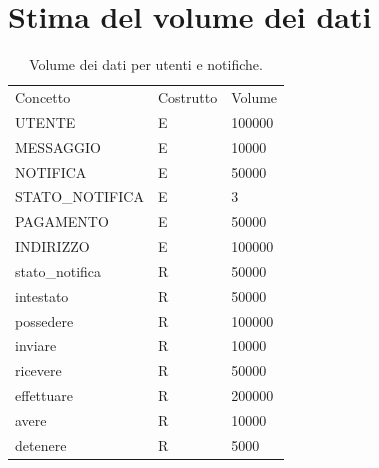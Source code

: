 \documentclass[a4paper,12pt]{report}
\begin{document}
	\section{Stima del volume dei dati} \label{s:volumes}
	\begin{table}[H]
		\centering
		\begin{tabular}{|lll|}
			\hline
			\rowcolor[HTML]{FFCE93}
			\multicolumn{3}{|l|}{\cellcolor[HTML]{FFCE93}Utenti e Notifiche} \\ \hline
			\rowcolor[HTML]{CBCEFB}
			Concetto            & Costrutto & Volume           \\ \hline
			UTENTE              & E         & 100000           \\ \hline
			MESSAGGIO           & E         & 10000            \\ \hline
			NOTIFICA            & E         & 50000            \\ \hline
			STATO\_NOTIFICA     & E         & 3                \\ \hline
			PAGAMENTO			& E 		& 50000			   \\ \hline
			INDIRIZZO			& E			& 100000		   \\ \hline
			stato\_notifica     & R         & 50000            \\ \hline
			intestato			& R			& 50000			   \\ \hline
			possedere			& R   		& 100000		   \\ \hline
			inviare             & R         & 10000            \\ \hline
			ricevere            & R         & 50000            \\ \hline
			effettuare          & R         & 200000           \\ \hline
			avere          		& R         & 10000            \\ \hline
			detenere            & R         & 5000             \\ \hline
		\end{tabular}
		\caption{Volume dei dati per utenti e notifiche.}
	\end{table}
	
\end{document}
